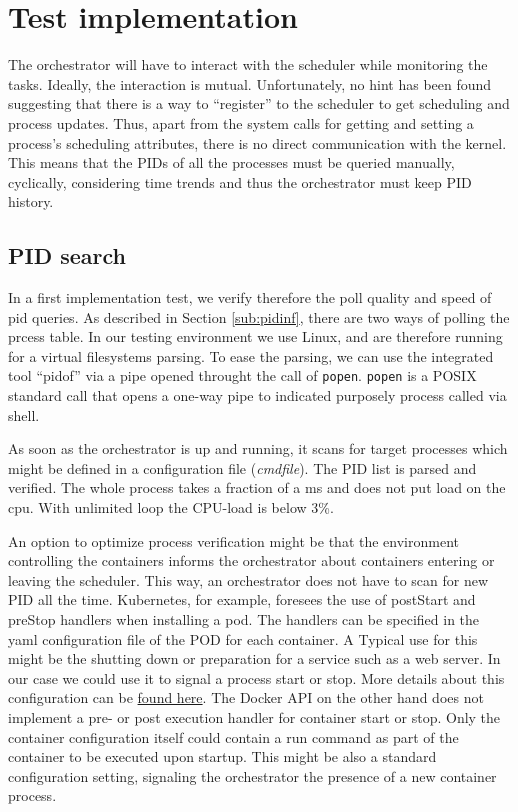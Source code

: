 \documentclass[]{scrartcl}
\begin{document}
\section{Test implementation}

The orchestrator will have to interact with the scheduler while monitoring the tasks. 
Ideally, the interaction is mutual. Unfortunately, no hint has been found suggesting that there is a way to ``register'' to the scheduler to get scheduling and process updates. 
Thus, apart from the system calls for getting and setting a process's scheduling attributes, there is no direct communication with the kernel. 
This means that the PIDs of all the processes must be queried manually, cyclically, considering time trends and thus the orchestrator must keep PID history. 

\subsection{PID search}

In a first implementation test, we verify therefore the poll quality and speed of pid queries.
As described in Section \ref{sub:pidinf}, there are two ways of polling the prcess table. 
In our testing environment we use Linux, and are therefore running for a virtual filesystems parsing. 
To ease the parsing, we can use the integrated tool ``pidof'' via a pipe opened throught the call of \texttt{popen}.
\texttt{popen} is a POSIX standard call that opens a one-way pipe to indicated  purposely process called via shell.

As soon as the orchestrator is up and running, it scans for target processes which might be  defined in a configuration file (\textit{cmdfile}).
The PID list is parsed and verified. 
The whole process takes a fraction of a ms and does not put load on the cpu. With unlimited loop the {CPU}-load is below 3\%.

An option to optimize process verification might be that the environment controlling the containers informs the orchestrator about containers entering or leaving the scheduler.
This way, an orchestrator does not have to scan for new PID all the time.
Kubernetes, for example, foresees the use of postStart and preStop handlers when installing a pod. 
The handlers can be specified in the yaml configuration file of the POD for each container. A Typical use for this might be the shutting down or preparation for a service such as a web server. 
In our case we could use it to signal a process start or stop.
More details about this configuration can be \href{{https://kubernetes.io/docs/tasks/configure-pod-container/attach-handler-lifecycle-event/}}{found here}.
The Docker API on the other hand does not implement a pre- or post execution handler for container start or stop. 
Only the container configuration itself could contain a run command as part of the container to be executed upon startup. This might be also a standard configuration setting, signaling the orchestrator the presence of a new container process.

 
\end{document}
